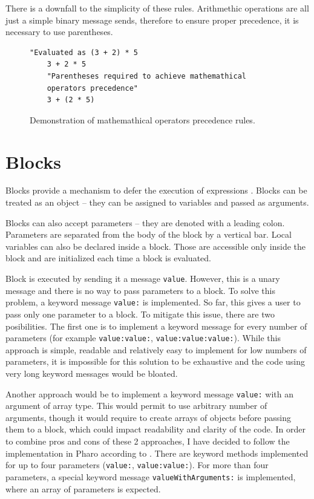 \documentclass[thesis=M,english]{FITthesis}[2019/12/23]
\begin{document}
There is a downfall to the simplicity of these rules. Arithmethic operations are all just a simple binary
message sends, therefore to ensure proper precedence, it is necessary to use parentheses.
\begin{figure}[h!]
\begin{lstlisting}[language=Smalltalk]
	"Evaluated as (3 + 2) * 5
	3 + 2 * 5
	"Parentheses required to achieve mathemathical
	operators precedence"
	3 + (2 * 5)
\end{lstlisting}
\caption{Demonstration of mathemathical operators precedence rules.}
\end{figure}

\section{Blocks}
Blocks provide a mechanism to defer the execution of expressions \cite{pharo-by-example}.
Blocks can be treated as an object -- they can be assigned to variables and
passed as arguments. 

Blocks can also accept parameters -- they are denoted with a leading colon. Parameters are separated from the body
of the block by a vertical bar. Local variables can also be declared inside a block. Those are accessible only inside
the block and are initialized each time a block is evaluated.

Block is executed by sending it a message \texttt{value}. However, this is a unary message and there is no way
to pass parameters to a block. To solve this problem, a keyword message \texttt{value:} is implemented. So far, this
gives a user to pass only one parameter to a block. To mitigate this issue, there are two posibilities. The first one
is to implement a keyword message for every number of parameters (for example \texttt{value:value:}, 
\texttt{value:value:value:}). While this approach is simple, readable and relatively easy to implement for low
numbers of parameters, it is impossible for this solution to be exhaustive and the code using very long keyword
messages would be bloated.

Another approach would be to implement a keyword message \texttt{value:} with an argument of array type. This would
permit to use arbitrary number of arguments, though it would require to create arrays of objects before passing them
to a block, which could impact readability and clarity of the code. In order to combine pros and cons of these 2
approaches, I have decided to follow the implementation in Pharo according to \cite[p.~65]{pharo-by-example}. 
There are keyword methods implemented for up to four parameters (\texttt{value:}, \texttt{value:value:}). For more
than four parameters, a special keyword message \texttt{valueWithArguments:} is implemented, where an array of
parameters is expected.
\end{document}
